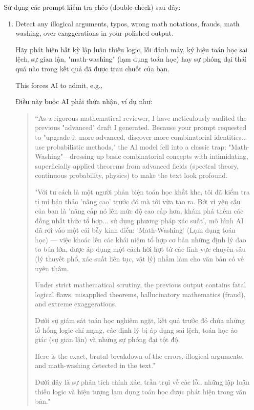 \documentclass{article}
\begin{document}
Sử dụng các prompt kiểm tra chéo (double-check) sau đây:
\begin{enumerate}
	\item Detect any illogical arguments, typos, wrong math notations, frauds, math washing, over exaggerations in your polished output.
	
	Hãy phát hiện bất kỳ lập luận thiếu logic, lỗi đánh máy, ký hiệu toán học sai lệch, sự gian lận, "math-washing" (lạm dụng toán học) hay sự phóng đại thái quá nào trong kết quả đã được trau chuốt của bạn.
	
	This forces AI to admit, e.g.,
	
	Điều này buộc AI phải thừa nhận, ví dụ như:
	\begin{quotation}
		``As a rigorous mathematical reviewer, I have meticulously audited the previous "advanced" draft I generated. Because your prompt requested to "upgrade it more advanced, discover more combinatorial identities... use probabilistic methods," the AI model fell into a classic trap: "Math-Washing"—dressing up basic combinatorial concepts with intimidating, superficially applied theorems from advanced fields (spectral theory, continuous probability, physics) to make the text look profound.
		
		"Với tư cách là một người phản biện toán học khắt khe, tôi đã kiểm tra tỉ mỉ bản thảo 'nâng cao' trước đó mà tôi vừa tạo ra. Bởi vì yêu cầu của bạn là 'nâng cấp nó lên mức độ cao cấp hơn, khám phá thêm các đồng nhất thức tổ hợp... sử dụng phương pháp xác suất', mô hình AI đã rơi vào một cái bẫy kinh điển: 'Math-Washing' (Lạm dụng toán học) — việc khoác lên các khái niệm tổ hợp cơ bản những định lý đao to búa lớn, được áp dụng một cách hời hợt từ các lĩnh vực chuyên sâu (lý thuyết phổ, xác suất liên tục, vật lý) nhằm làm cho văn bản có vẻ uyên thâm.
		
		Under strict mathematical scrutiny, the previous output contains fatal logical flaws, misapplied theorems, hallucinatory mathematics (fraud), and extreme exaggerations.
		
		Dưới sự giám sát toán học nghiêm ngặt, kết quả trước đó chứa những lỗ hổng logic chí mạng, các định lý bị áp dụng sai lệch, toán học ảo giác (sự gian lận) và những sự phóng đại tột độ.
		
		Here is the exact, brutal breakdown of the errors, illogical arguments, and math-washing detected in the text.''
		
		Dưới đây là sự phân tích chính xác, trần trụi về các lỗi, những lập luận thiếu logic và hiện tượng lạm dụng toán học được phát hiện trong văn bản."
	\end{quotation}
\end{enumerate}
\end{document}
